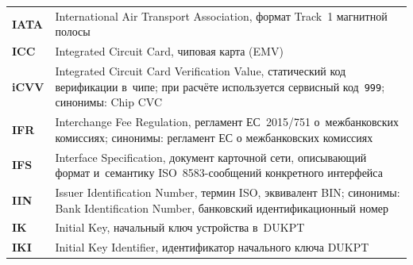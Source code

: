\begin{longtable}{@{}p{4.5em}p{\dimexpr\linewidth-4.5em-2\tabcolsep\relax}@{}}
  \textbf{IATA}              & International Air Transport Association, формат Track~1 магнитной полосы                                                                                                                                                                                                                         \\
  \textbf{ICC}               & Integrated Circuit Card, чиповая карта (EMV)                                                                                                                                                                                                                                                     \\
  \textbf{iCVV}              & Integrated Circuit Card Verification Value, статический код верификации в~чипе; при расчёте используется сервисный код~\texttt{999}; синонимы: Chip CVC                                                                                                                                             \\
  \textbf{IFR}               & Interchange Fee Regulation, регламент ЕС~2015/751 о~межбанковских комиссиях; синонимы: регламент ЕС о межбанковских комиссиях                                                                                                                                                                    \\
  \textbf{IFS}               & Interface Specification, документ карточной сети, описывающий формат и~семантику ISO~8583-сообщений конкретного интерфейса                                                                                                                                                                      \\
  \textbf{IIN}               & Issuer Identification Number, термин ISO, эквивалент BIN; синонимы: Bank Identification Number, банковский идентификационный номер                                                                                                                                                               \\
  \textbf{IK}                & Initial Key, начальный ключ устройства в~DUKPT                                                                                                                                                                                                                                                   \\
  \textbf{IKI}               & Initial Key Identifier, идентификатор начального ключа DUKPT                                                                                                                                                                                                                                     \\

\end{longtable}
